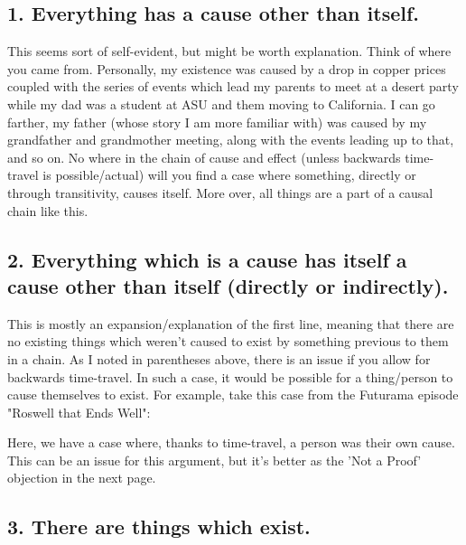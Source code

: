 \subsection{1. Everything has a cause other than itself.}

This seems sort of self-evident, but might be worth explanation. Think of where you came from. Personally, my existence was caused by a drop in copper prices coupled with the series of events which lead my parents to meet at a desert party while my dad was a student at ASU and them moving to California. I can go farther, my father (whose story I am more familiar with) was caused by my grandfather and grandmother meeting, along with the events leading up to that, and so on. No where in the chain of cause and effect (unless backwards time-travel is possible/actual) will you find a case where something, directly or through transitivity, causes itself. More over, all things are a part of a causal chain like this. 

\subsection{2. Everything which is a cause has itself a cause other than itself (directly or indirectly).}

This is mostly an expansion/explanation of the first line, meaning that there are no existing things which weren't caused to exist by something previous to them in a chain. As I noted in parentheses above, there is an issue if you allow for backwards time-travel. In such a case, it would be possible for a thing/person to cause themselves to exist. For example, take this case from the Futurama episode "Roswell that Ends Well":


Here, we have a case where, thanks to time-travel, a person was their own cause. This can be an issue for this argument, but it's better as the 'Not a Proof' objection in the next page. 

\subsection{3. There are things which exist.}

